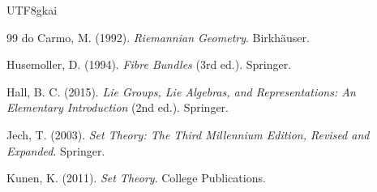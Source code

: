 \documentclass[12pt]{article}
\begin{document}
\begin{CJK*}{UTF8}{gkai}
\begin{thebibliography}{99}
do Carmo, M. (1992).
\newblock \emph{Riemannian Geometry}.
\newblock Birkh\"{a}user.

Husemoller, D. (1994).
\newblock \emph{Fibre Bundles} (3rd ed.).
\newblock Springer.

Hall, B. C. (2015).
\newblock \emph{Lie Groups, Lie Algebras, and Representations: An Elementary Introduction} (2nd ed.).
\newblock Springer.

Jech, T. (2003).
\newblock \emph{Set Theory: The Third Millennium Edition, Revised and Expanded}.
\newblock Springer.

Kunen, K. (2011).
\newblock \emph{Set Theory}.
\newblock College Publications.

\end{thebibliography}

\end{CJK*}
\end{document}
